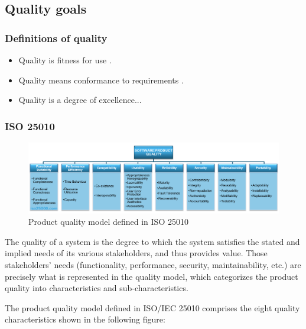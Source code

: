 
\subsection{Quality goals}

\subsubsection{Definitions of quality}
\begin{itemize}
    \tightlist
    \item Quality is fitness for use \cite{asq2005qualityglossary}.
    \item Quality means conformance to requirements \cite{morgan1994total}.
    \item Quality is a degree of excellence...\cite{merriam2007qualitydefinition}
\end{itemize}

\subsubsection{ISO 25010}

\begin{figure}[H]
    \centering
    \includegraphics[width=1\textwidth]{images/iso25010.png}
    \caption{Product quality model defined in ISO 25010}
    \label{productquality model}
\end{figure}

The quality of a system is the degree to which the system satisfies the stated and implied needs of
its various stakeholders, and thus provides value. Those stakeholders' needs (functionality,
performance, security, maintainability, etc.) are precisely what is represented in the quality model,
which categorizes the product quality into characteristics and sub-characteristics.

The product quality model defined in ISO/IEC 25010 comprises the eight quality characteristics
shown in the following figure:

